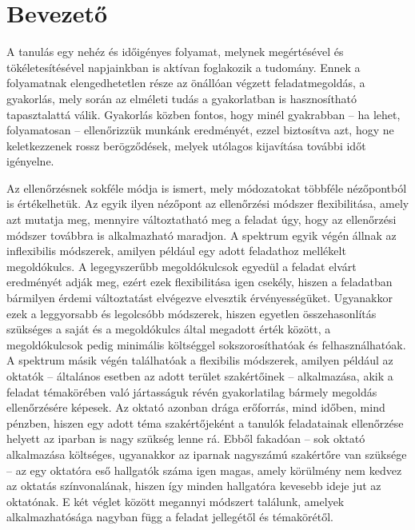 \chapter*{Bevezető}

A tanulás egy nehéz és időigényes folyamat, melynek megértésével és tökéletesítésével napjainkban is aktívan foglakozik a tudomány.
Ennek a folyamatnak elengedhetetlen része az önállóan végzett feladatmegoldás, a gyakorlás, mely során az elméleti tudás a gyakorlatban is hasznosítható tapasztalattá válik.
Gyakorlás közben fontos, hogy minél gyakrabban -- ha lehet, folyamatosan -- ellenőrizzük munkánk eredményét, ezzel biztosítva azt, hogy ne keletkezzenek rossz berögződések, melyek utólagos kijavítása további időt igényelne.

Az ellenőrzésnek sokféle módja is ismert, mely módozatokat többféle nézőpontból is értékelhetük.
Az egyik ilyen nézőpont az ellenőrzési módszer flexibilitása, amely azt mutatja meg, mennyire változtatható meg a feladat úgy, hogy az ellenőrzési módszer továbbra is alkalmazható maradjon.
A spektrum egyik végén állnak az inflexibilis módszerek, amilyen például egy adott feladathoz mellékelt megoldókulcs.
A legegyszerűbb megoldókulcsok egyedül a feladat elvárt eredményét adják meg, ezért ezek flexibilitása igen csekély, hiszen a feladatban bármilyen érdemi változtatást elvégezve elvesztik érvényességüket. 
Ugyanakkor ezek a leggyorsabb és legolcsóbb módszerek, hiszen egyetlen összehasonlítás szükséges a saját és a megoldókulcs által megadott érték között, a megoldókulcsok pedig minimális költséggel sokszorosíthatóak és felhasználhatóak.
A spektrum másik végén találhatóak a flexibilis módszerek, amilyen például az oktatók -- általános esetben az adott terület szakértőinek -- alkalmazása, akik a feladat témakörében való jártasságuk révén gyakorlatilag bármely megoldás ellenőrzésére képesek.
Az oktató azonban drága erőforrás, mind időben, mind pénzben, hiszen egy adott téma szakértőjeként a tanulók feladatainak ellenőrzése helyett az iparban is nagy szükség lenne rá.
Ebből fakadóan -- sok oktató alkalmazása költséges, ugyanakkor az iparnak nagyszámú szakértőre van szüksége -- az egy oktatóra eső hallgatók száma igen magas, amely körülmény nem kedvez az oktatás színvonalának, hiszen így minden hallgatóra kevesebb ideje jut az oktatónak.
E két véglet között megannyi módszert találunk, amelyek alkalmazhatósága nagyban függ a feladat jellegétől és témakörétől.

